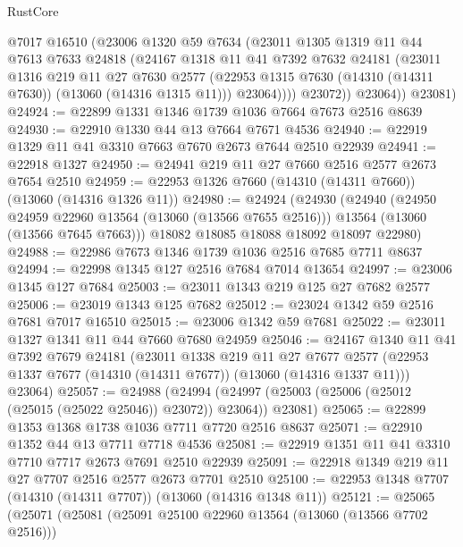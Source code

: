 \begin{lexlean}{RustCore}
\begin{coremodule}
              @7017
              @16510
              (@23006
                @1320
                @59
                @7634
                (@23011
                  @1305
                  @1319
                  @11
                  @44
                  @7613
                  @7633
                  @24818
                  (@24167
                    @1318
                    @11
                    @41
                    @7392
                    @7632
                    @24181
                    (@23011
                      @1316
                      @219
                      @11
                      @27
                      @7630
                      @2577
                      (@22953 @1315 @7630 (@14310 (@14311 @7630)) (@13060 (@14316 @1315 @11)))
                      @23064))))
              @23072))
          @23064))
      @23081)
@24924 := @22899 @1331 @1346 @1739 @1036 @7664 @7673 @2516 @8639
@24930 := @22910 @1330 @44 @13 @7664 @7671 @4536
@24940 := @22919 @1329 @11 @41 @3310 @7663 @7670 @2673 @7644 @2510 @22939
@24941 := @22918 @1327
@24950 := @24941 @219 @11 @27 @7660 @2516 @2577 @2673 @7654 @2510
@24959 := @22953 @1326 @7660 (@14310 (@14311 @7660)) (@13060 (@14316 @1326 @11))
@24980 := @24924
    (@24930
      (@24940
        (@24950 @24959 @22960 @13564 (@13060 (@13566 @7655 @2516)))
        @13564
        (@13060 (@13566 @7645 @7663)))
      @18082
      @18085
      @18088
      @18092
      @18097
      @22980)
@24988 := @22986 @7673 @1346 @1739 @1036 @2516 @7685 @7711 @8637
@24994 := @22998 @1345 @127 @2516 @7684 @7014 @13654
@24997 := @23006 @1345 @127 @7684
@25003 := @23011 @1343 @219 @125 @27 @7682 @2577
@25006 := @23019 @1343 @125 @7682
@25012 := @23024 @1342 @59 @2516 @7681 @7017 @16510
@25015 := @23006 @1342 @59 @7681
@25022 := @23011 @1327 @1341 @11 @44 @7660 @7680 @24959
@25046 := @24167
    @1340
    @11
    @41
    @7392
    @7679
    @24181
    (@23011
      @1338
      @219
      @11
      @27
      @7677
      @2577
      (@22953 @1337 @7677 (@14310 (@14311 @7677)) (@13060 (@14316 @1337 @11)))
      @23064)
@25057 := @24988
    (@24994 (@24997 (@25003 (@25006 (@25012 (@25015 (@25022 @25046)) @23072)) @23064)) @23081)
@25065 := @22899 @1353 @1368 @1738 @1036 @7711 @7720 @2516 @8637
@25071 := @22910 @1352 @44 @13 @7711 @7718 @4536
@25081 := @22919 @1351 @11 @41 @3310 @7710 @7717 @2673 @7691 @2510 @22939
@25091 := @22918 @1349 @219 @11 @27 @7707 @2516 @2577 @2673 @7701 @2510
@25100 := @22953 @1348 @7707 (@14310 (@14311 @7707)) (@13060 (@14316 @1348 @11))
@25121 := @25065
    (@25071
      (@25081
        (@25091 @25100 @22960 @13564 (@13060 (@13566 @7702 @2516)))

\end{coremodule}
\end{lexlean}
